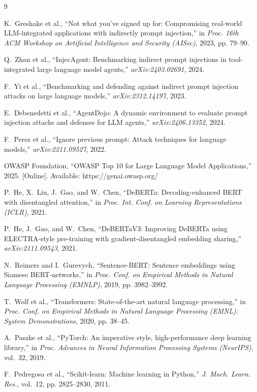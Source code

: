 \documentclass[journal]{IEEEtran}
\begin{document}
\begin{thebibliography}{9}

K.~Greshake et al., ``Not what you've signed up for: Compromising real-world
LLM-integrated applications with indirectly prompt injection,'' in \emph{Proc.
16th ACM Workshop on Artificial Intelligence and Security (AISec)}, 2023,
pp. 79--90.

Q.~Zhan et al., ``InjecAgent: Benchmarking indirect prompt injections in
tool-integrated large language model agents,'' \emph{arXiv:2403.02691}, 2024.

F.~Yi et al., ``Benchmarking and defending against indirect prompt injection
attacks on large language models,'' \emph{arXiv:2312.14197}, 2023.

E.~Debenedetti et al., ``AgentDojo: A dynamic environment to evaluate
prompt injection attacks and defenses for LLM agents,'' \emph{arXiv:2406.13352},
2024.

F.~Perez et al., ``Ignore previous prompt: Attack techniques for language
models,'' \emph{arXiv:2211.09527}, 2022.

OWASP Foundation, ``OWASP Top 10 for Large Language Model Applications,''
2025. [Online]. Available: https://genai.owasp.org/

P.~He, X.~Liu, J.~Gao, and W.~Chen, ``DeBERTa: Decoding-enhanced BERT with
disentangled attention,'' in \emph{Proc. Int. Conf. on Learning
Representations (ICLR)}, 2021.

P.~He, J.~Gao, and W.~Chen, ``DeBERTaV3: Improving DeBERTa using
ELECTRA-style pre-training with gradient-disentangled embedding sharing,''
\emph{arXiv:2111.09543}, 2021.

N.~Reimers and I.~Gurevych, ``Sentence-BERT: Sentence embeddings using
Siamese BERT-networks,'' in \emph{Proc. Conf. on Empirical Methods in Natural
Language Processing (EMNLP)}, 2019, pp. 3982--3992.

T.~Wolf et al., ``Transformers: State-of-the-art natural language
processing,'' in \emph{Proc. Conf. on Empirical Methods in Natural Language
Processing (EMNL): System Demonstrations}, 2020, pp. 38--45.

A.~Paszke et al., ``PyTorch: An imperative style, high-performance deep
learning library,'' in \emph{Proc. Advances in Neural Information Processing
Systems (NeurIPS)}, vol.~32, 2019.

F.~Pedregosa et al., ``Scikit-learn: Machine learning in Python,'' \emph{J.
Mach. Learn. Res.}, vol.~12, pp. 2825--2830, 2011.

\end{thebibliography}
\end{document}
